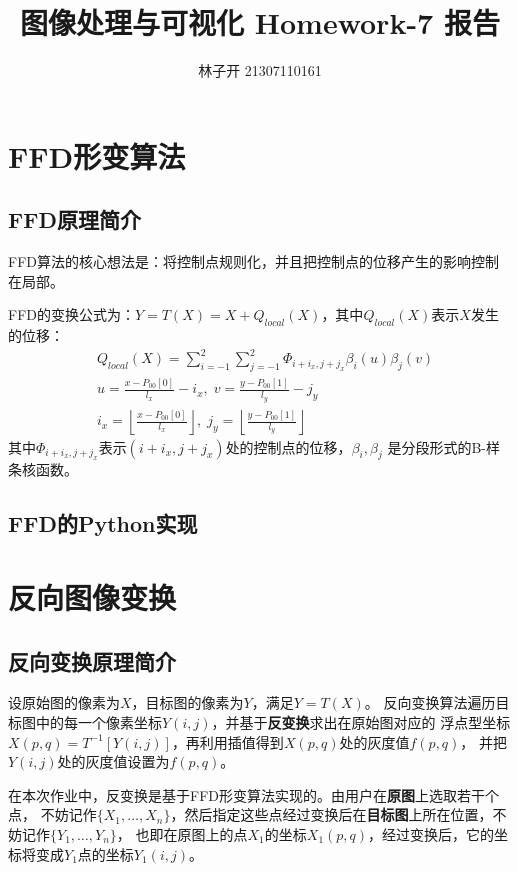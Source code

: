 \documentclass{article}
\title{图像处理与可视化 Homework-7 报告}
\author{林子开 21307110161}
\begin{document}
	\maketitle
	\tableofcontents

\section{FFD形变算法}
\subsection{FFD原理简介}
FFD算法的核心想法是：将控制点规则化，并且把控制点的位移产生的影响控制在局部。

FFD的变换公式为：$Y=T(X) = X + Q_{local}(X)$，其中$Q_{local}(X)$表示$X$发生的位移：
\begin{align*}
&Q_{local}(X) = \sum_{i=-1}^{2} \sum_{j=-1}^{2} \varPhi_{i+i_x,j+j_x} \beta_i(u)\beta_j(v) \\
&u = \frac{x-P_{00}[0]}{l_x}-i_x, \; v=\frac{y-P_{00}[1]}{l_y}-j_y \\
&i_x = \left\lfloor\frac{x-P_{00}[0]}{l_x}\right\rfloor, \; j_y = \left\lfloor \frac{y-P_{00}[1]}{l_y} \right\rfloor 
\end{align*}
其中$\varPhi_{i+i_x,j+j_x}$表示$(i+i_x,j+j_x)$处的控制点的位移，$\beta_i,\beta_j$
是分段形式的B-样条核函数。

\subsection{FFD的Python实现}
 

\section{反向图像变换}

\subsection{反向变换原理简介}
设原始图的像素为$X$，目标图的像素为$Y$，满足$Y=T(X)$。
反向变换算法遍历目标图中的每一个像素坐标$Y(i,j)$，并基于\textbf{反变换}求出在原始图对应的
浮点型坐标$X(p,q)=T^{-1}[Y(i,j)]$，再利用插值得到$X(p,q)$处的灰度值$f(p,q)$，
并把$Y(i,j)$处的灰度值设置为$f(p,q)$。

在本次作业中，反变换是基于FFD形变算法实现的。由用户在\textbf{原图}上选取若干个点，
不妨记作$\{X_1,\dots , X_n\}$，然后指定这些点经过变换后在\textbf{目标图}上所在位置，不妨记作$\{Y_1,\dots,Y_n\}$，
也即在原图上的点$X_1$的坐标$X_1(p,q)$，经过变换后，它的坐标将变成$Y_1$点的坐标$Y_1(i,j)$。
\end{document}
